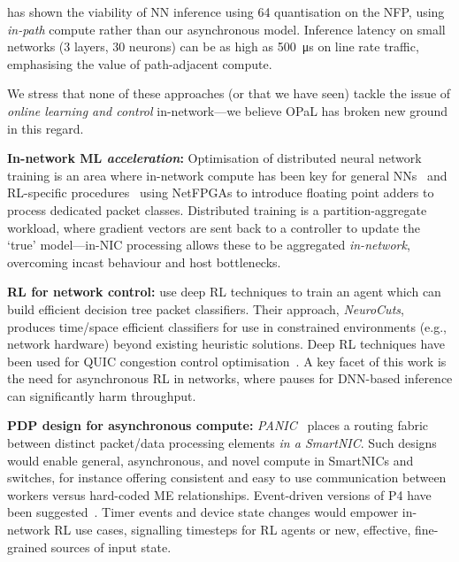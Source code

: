 \documentclass[
conference
,10pt
]{IEEEtran}
\newcommand{\fakepara}[1]{\noindent\textbf{#1:}}
\newcommand{\approachshort}{OPaL}
\begin{document}
\textcite{langlet-ml-netronome} has shown the viability of NN inference using \SI{64}{\bit} quantisation on the NFP, using \emph{in-path} compute rather than our asynchronous model.
Inference latency on small networks (3 layers, \num{30} neurons) can be as high as \SI{500}{\micro\second} on line rate traffic, emphasising the value of path-adjacent compute.

We stress that none of these approaches (or that we have seen) tackle the issue of \emph{online learning and control} in-network---we believe \approachshort{} has broken new ground in this regard.

\fakepara{In-network ML \emph{acceleration}}
Optimisation of distributed neural network training is an area where in-network compute has been key for general NNs~\parencite{DBLP:conf/micro/LiPAYQPWSEK18} and RL-specific procedures~\parencite{DBLP:conf/isca/LiLYCSH19} using NetFPGAs to introduce floating point adders to process dedicated packet classes.
Distributed training is a partition-aggregate workload, where gradient vectors are sent back to a controller to update the `true' model---in-NIC processing allows these to be aggregated \emph{in-network}, overcoming incast behaviour and host bottlenecks.

\fakepara{RL for network control}
\Textcite{DBLP:conf/sigcomm/LiangZJS19} use deep RL techniques to train an agent which can build efficient decision tree packet classifiers.
Their approach, \emph{NeuroCuts}, produces time/space efficient classifiers for use in constrained environments (e.g., network hardware) beyond existing heuristic solutions.
Deep RL techniques have been used for QUIC congestion control optimisation~\parencite{DBLP:journals/corr/abs-1910-04054}.
A key facet of this work is the need for asynchronous RL in networks, where pauses for DNN-based inference can significantly harm throughput.

\fakepara{PDP design for asynchronous compute}
\emph{PANIC}~\parencite{DBLP:conf/hotnets/StephensAS18} places a routing fabric between distinct packet/data processing elements \emph{in a SmartNIC}.
Such designs would enable general, asynchronous, and novel compute in SmartNICs and switches, for instance offering consistent and easy to use communication between workers versus hard-coded ME relationships.
Event-driven versions of P4 have been suggested~\parencite{DBLP:conf/hotnets/IbanezABM19}.
Timer events and device state changes would empower in-network RL use cases, signalling timesteps for RL agents or new, effective, fine-grained sources of input state.
\end{document}
